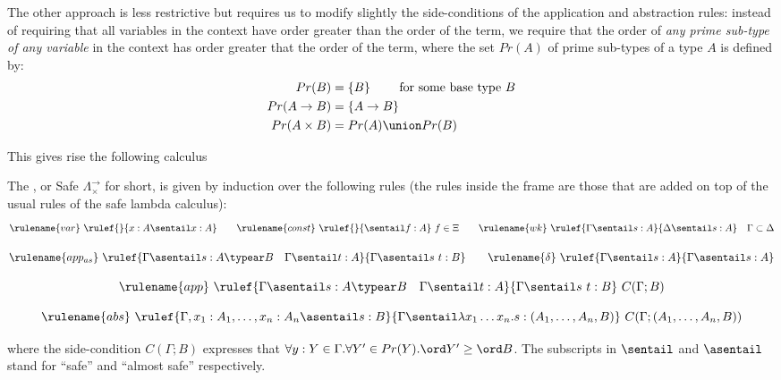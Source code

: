 The other approach is less restrictive but requires us to modify
slightly the side-conditions of the application and abstraction
rules: instead of requiring that all variables in the context have
order greater than the order of the term, we require that the order
of \emph{any prime sub-type of any variable} in the context has
order greater that the order of the term, where the set $Pr(A)$ of
prime sub-types of a type $A$ is defined by:
\begin{align*}
Pr(B) &= \{ B \} \qquad \mbox{ for some base type } B \\
Pr(A\rightarrow B) &= \{ A\rightarrow B \} \\
Pr(A\times B) &= Pr(A) \union Pr(B)
\end{align*}

This gives rise the following calculus
\begin{definition}\rm
\label{def:safecalc_withprod}
 The , or Safe $\Lambda^{\rightarrow}_\times$ for short, is given
by induction over the following rules (the rules inside the frame are those that
are added on top of the usual rules of the safe lambda calculus):
$$ \rulename{var} \ \rulef{}{x : A\sentail x : A} \qquad
\rulename{const} \ \rulef{}{\sentail f : A}~f \in \Xi \qquad
\rulename{wk} \ \rulef{\Gamma \sentail s : A}{\Delta \sentail s : A}
\quad \Gamma \subset \Delta$$
\begin{center}
\end{center}

$$ \rulename{app_{as}} \ \rulef{\Gamma \asentail s : A\typear B
\quad \Gamma \sentail t : A} {\Gamma \asentail s~t : B}
\qquad
\rulename{\delta} \ \rulef{\Gamma \sentail s : A}{\Gamma \asentail s : A}
$$

$$ \rulename{app} \ \rulef{\Gamma \asentail s : A\typear B
\quad \Gamma \sentail t : A} {\Gamma \sentail s~t : B} \ C(\Gamma ; B)$$

$$ \rulename{abs} \ \rulef{\Gamma, x_1 : A_1, \ldots, x_n : A_n
  \asentail s : B} {\Gamma \sentail \lambda x_1 \ldots x_n . s :
  (A_1, \ldots ,A_n,B)} \ C(\Gamma ; (A_1, \ldots ,A_n,B) )$$

\noindent where the side-condition $C(\Gamma ; B)$ expresses that
$\forall y:Y \in \Gamma. \forall Y' \in Pr(Y) . \ord Y' \geq \ord
B$. The subscripts in $\sentail$ and $\asentail$ stand for ``safe''
and ``almost safe'' respectively.
\end{definition}

